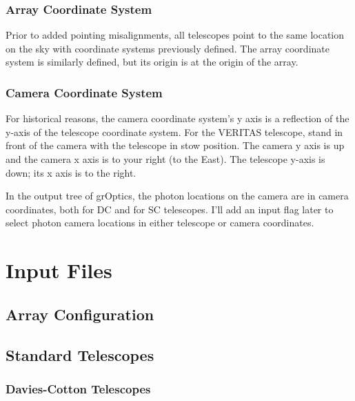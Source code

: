 \documentclass{article}
\begin{document}
\subsubsection{Array Coordinate System} 
  Prior to added pointing misalignments, all telescopes point to the same location
  on the sky with coordinate systems previously defined.  
  The array coordinate system is similarly defined, but its
  origin is at the origin of the array.

\subsubsection{Camera Coordinate System}
  For historical reasons, the camera coordinate system's y axis is a reflection of the 
  y-axis of the telescope coordinate system. For the VERITAS telescope, stand in front of the
  camera with the telescope in stow position. The camera y axis is up and the camera x axis
  is to your right (to the East).  The telescope y-axis is down; its x axis is to the right.
  
  In the output tree of grOptics, the photon locations on the camera are in camera coordinates,
  both for DC and for SC telescopes.  I'll add an input flag later to select photon camera
  locations in either telescope or camera coordinates.

\section{Input Files}\label{S:INPUT}

\subsection{Array Configuration}\label{SS:ARRAY}

\subsection{Standard Telescopes}\label{SSS:STEL1}


\subsubsection{Davies-Cotton Telescopes}\label{SSS:DCTEL}
\end{document}
